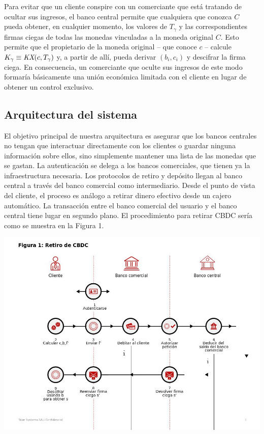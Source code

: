 \documentclass[10pt,spanish]{article}
\begin{document}
Para evitar que un cliente conspire con un comerciante que está tratando
de ocultar sus ingresos, el banco central permite que cualquiera que
conozca $C$ pueda obtener, en cualquier momento, los valores de
$T_{\gamma}$ y las correspondientes firmas ciegas de todas las monedas
vinculadas a la moneda original $C$. Esto permite que el propietario de la
moneda original -- que conoce $c$ -- calcule
$K_{\gamma} \equiv \emph{KX}( c,T_{\gamma})$ y, a partir de
allí, pueda derivar $(b_{i},c_{i})$ y descifrar la firma
ciega. En consecuencia, un comerciante que oculte sus ingresos de este
modo formaría básicamente una unión económica limitada con el cliente en
lugar de obtener un control exclusivo.

\hypertarget{arquitectura-del-sistema}{%
\subsection{Arquitectura del sistema}\label{arquitectura-del-sistema}}

El objetivo principal de nuestra arquitectura es asegurar que los bancos
centrales no tengan que interactuar directamente con los clientes o
guardar ninguna información sobre ellos, sino simplemente mantener una
lista de las monedas que se gastan. La autenticación se delega a los
bancos comerciales, que tienen ya la infraestructura necesaria. Los
protocolos de retiro y depósito llegan al banco central a través del
banco comercial como intermediario. Desde el punto de vista del cliente,
el proceso es análogo a retirar dinero efectivo desde un cajero
automático. La transacción entre el banco comercial del usuario y el
banco central tiene lugar en segundo plano. El procedimiento para
retirar CBDC sería como se muestra en la Figura 1.

\includegraphics[width=\textwidth]{taler_figure_1_dora_SPANISH.jpg}
\end{document}

